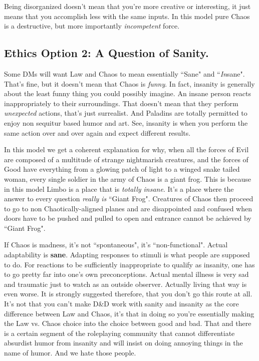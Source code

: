 Being disorganized doesn't mean that you're more creative or interesting, it just means that you accomplish less with the same inputs. In this model pure Chaos is a destructive, but more importantly \textit{incompetent} force.

\subsection{Ethics Option 2: A Question of Sanity.}
Some DMs will want Law and Chaos to mean essentially ``Sane" and ``\textit{In}sane". That's fine, but it doesn't mean that Chaos is \textit{funny}. In fact, insanity is generally about the least funny thing you could possibly imagine. An insane person reacts inappropriately to their surroundings. That doesn't mean that they perform \textit{unexpected} actions, that's just surrealist. And Paladins are totally permitted to enjoy non sequitur based humor and art. See, insanity is when you perform the same action over and over again and expect different results.

In this model we get a coherent explanation for why, when all the forces of Evil are composed of a multitude of strange nightmarish creatures, and the forces of Good have everything from a glowing patch of light to a winged snake tailed woman, every single soldier in the army of Chaos is a giant frog. This is because in this model Limbo is a place that is \textit{totally insane}. It's a place where the answer to every question \textit{really is} ``Giant Frog". Creatures of Chaos then proceed to go to non Chaotically-aligned planes and are disappointed and confused when doors have to be pushed and pulled to open and entrance cannot be achieved by ``Giant Frog".

If Chaos is madness, it's not ``spontaneous", it's ``non-functional". Actual adaptability is \textbf{sane}. Adapting responses to stimuli is what people are supposed to do. For reactions to be sufficiently inappropriate to qualify as insanity, one has to go pretty far into one's own preconceptions. Actual mental illness is very sad and traumatic just to watch as an outside observer. Actually living that way is even worse. It is strongly suggested therefore, that you don't go this route at all. It's not that you can't make D\&D work with sanity and insanity as the core difference between Law and Chaos, it's that in doing so you're essentially making the Law vs. Chaos choice into the choice between good and bad. That and there is a certain segment of the roleplaying community that cannot differentiate absurdist humor from insanity and will insist on doing annoying things in the name of humor. And we hate those people.

